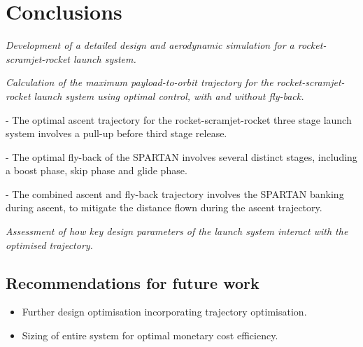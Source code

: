 
\cleardoublepage
\chapter{Conclusions}


	\emph{Development of a detailed design and aerodynamic simulation for a rocket-scramjet-rocket launch system.}
	
	

	
\emph{Calculation of the maximum payload-to-orbit trajectory for the rocket-scramjet-rocket launch system using optimal control, with and without fly-back.}

- The optimal ascent trajectory for the rocket-scramjet-rocket three stage launch system involves a pull-up before third stage release. 

- The optimal fly-back of the SPARTAN involves several distinct stages, including a boost phase, skip phase and glide phase. 

- The combined ascent and fly-back trajectory involves the SPARTAN banking during ascent, to mitigate the distance flown during the ascent trajectory. 
	

	
	\emph{Assessment of how key design parameters of the launch system interact with the optimised trajectory.} 
	

	



  \section{Recommendations for future work}

\begin{itemize}
	\item Further design optimisation incorporating trajectory optimisation.	
	\item Sizing of entire system for optimal monetary cost efficiency. 
\end{itemize}